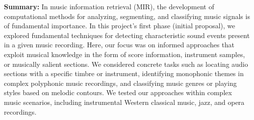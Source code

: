 \documentclass[11pt,a4paper]{article}
\newcommand{\egc}{e.g.,\ }
\theoremstyle{plain} \newtheorem{define}{Definition}[section]
\begin{document}
{\bf Summary:}
%
%
%
%
In music information retrieval (MIR), the development of computational methods for analyzing, segmenting, and classifying music signals is of fundamental importance. In this project's first phase (initial proposal), we explored fundamental techniques for detecting characteristic sound events present in a given music recording. Here, our focus was on informed approaches that exploit musical knowledge in the form of score information, instrument samples, or musically salient sections. We considered concrete tasks such as locating audio sections with a specific timbre or instrument, identifying monophonic themes in complex polyphonic music recordings, and classifying music genres or playing styles based on melodic contours. We tested our approaches within complex music scenarios, including instrumental Western classical music, jazz, and opera recordings.
\end{document}
